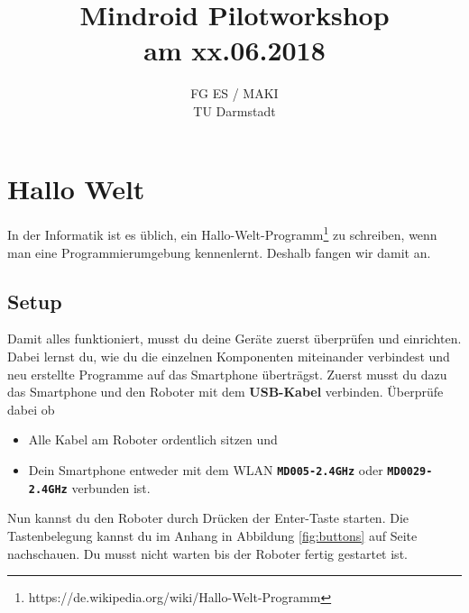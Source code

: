 \documentclass[
	12pt,
	article,
	type=bsc, %
	colorbacktitle,
	instlogo,
	accentcolor=tud1c,
	german,
	twoside
]{tudexercise}
\newcommand{\bfcode}[1]{\texttt{\textbf{#1}}}
\begin{document}
	\author{}
	\title{Mindroid Pilotworkshop \\ am xx.06.2018}
	\subtitle{FG ES / MAKI \\ TU Darmstadt}
	\subsubtitle{}

	\maketitle
	
	
	
	\newpage
	
	\section{Hallo Welt}
	In der Informatik ist es üblich, ein Hallo-Welt-Programm\footnote{https://de.wikipedia.org/wiki/Hallo-Welt-Programm} zu schreiben, wenn man eine Programmierumgebung kennenlernt. Deshalb fangen wir damit an. 
	
	\subsection{Setup}
	Damit alles funktioniert, musst du deine Geräte zuerst überprüfen und einrichten. Dabei lernst du, wie du die einzelnen Komponenten miteinander verbindest und neu erstellte Programme auf das Smartphone überträgst.
	Zuerst musst du dazu das Smartphone und den Roboter mit dem \textbf{USB-Kabel} verbinden. Überprüfe dabei ob
	\begin{itemize}
	\item Alle Kabel am Roboter ordentlich sitzen und
	\item Dein Smartphone entweder mit dem WLAN \bfcode{MD005-2.4GHz} oder \bfcode{MD0029-2.4GHz} verbunden ist.
	\end{itemize}
	
	Nun kannst du den Roboter durch Drücken der Enter-Taste starten.  Die Tastenbelegung kannst du im Anhang in Abbildung \ref{fig:buttons} auf Seite \pageref{fig:buttons} nachschauen. Du musst nicht warten bis der Roboter fertig gestartet ist.
\end{document}
